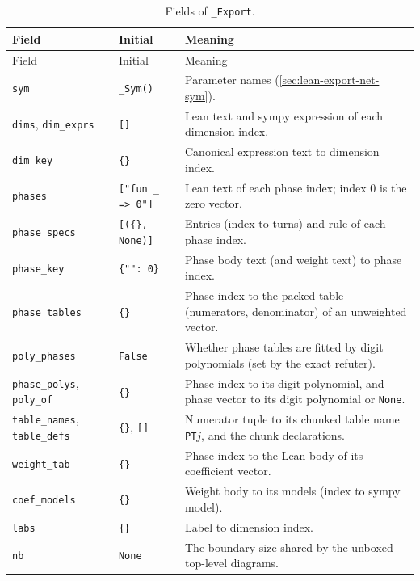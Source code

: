 {\begin{xltabular}{\linewidth}{@{}p{3.3cm}p{3.2cm}X@{}}
\caption{Fields of \texttt{\_\allowbreak{}Export}.}\label{tab:lean-export-net-state}\\
\toprule
Field & Initial & Meaning \\
\midrule
\endfirsthead
\toprule
Field & Initial & Meaning \\
\midrule
\endhead
\texttt{sym} & \texttt{\_\allowbreak{}Sym()} & Parameter names (\cref{sec:lean-export-net-sym}). \\
\texttt{dims}, \texttt{dim\_\allowbreak{}exprs} & \texttt{[]} & Lean text and sympy expression of each dimension index. \\
\texttt{dim\_\allowbreak{}key} & \texttt{\{\}} & Canonical expression text to dimension index. \\
\texttt{phases} & \texttt{["fun \_\allowbreak{} => 0"]} & Lean text of each phase index; index 0 is the zero vector. \\
\texttt{phase\_\allowbreak{}specs} & \texttt{[(\{\}, None)]} & Entries (index to turns) and rule of each phase index. \\
\texttt{phase\_\allowbreak{}key} & \texttt{\{"": 0\}} & Phase body text (and weight text) to phase index. \\
\texttt{phase\_\allowbreak{}tables} & \texttt{\{\}} & Phase index to the packed table (numerators, denominator) of an unweighted vector. \\
\texttt{poly\_\allowbreak{}phases} & \texttt{False} & Whether phase tables are fitted by digit polynomials (set by the exact refuter). \\
\texttt{phase\_\allowbreak{}polys}, \texttt{poly\_\allowbreak{}of} & \texttt{\{\}} & Phase index to its digit polynomial, and phase vector to its digit polynomial or \texttt{None}. \\
\texttt{table\_\allowbreak{}names}, \texttt{table\_\allowbreak{}defs} & \texttt{\{\}}, \texttt{[]} & Numerator tuple to its chunked table name \texttt{PT}$j$, and the chunk declarations. \\
\texttt{weight\_\allowbreak{}tab} & \texttt{\{\}} & Phase index to the Lean body of its coefficient vector. \\
\texttt{coef\_\allowbreak{}models} & \texttt{\{\}} & Weight body to its models (index to sympy model). \\
\texttt{labs} & \texttt{\{\}} & Label to dimension index. \\
\texttt{nb} & \texttt{None} & The boundary size shared by the unboxed top-level diagrams. \\

\end{xltabular}}
